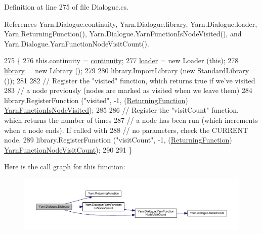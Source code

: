 Definition at line 275 of file Dialogue.\-cs.



References Yarn.\-Dialogue.\-continuity, Yarn.\-Dialogue.\-library, Yarn.\-Dialogue.\-loader, Yarn.\-Returning\-Function(), Yarn.\-Dialogue.\-Yarn\-Function\-Is\-Node\-Visited(), and Yarn.\-Dialogue.\-Yarn\-Function\-Node\-Visit\-Count().


\begin{DoxyCode}
275                                                          \{
276             this.continuity = \hyperlink{a00090_ae94eaa4b03b432422f5d205fabe37ff5}{continuity};
277             \hyperlink{a00090_a98bbe0ac2ccadeeeb7e05e3e6e19f2e0}{loader} = \textcolor{keyword}{new} Loader (\textcolor{keyword}{this});
278             \hyperlink{a00090_ae660d4cfb6e296358d2f61d8ee74c66a}{library} = \textcolor{keyword}{new} Library ();
279 
280             library.ImportLibrary (\textcolor{keyword}{new} StandardLibrary ());
281 
282             \textcolor{comment}{// Register the "visited" function, which returns true if we've visited}
283             \textcolor{comment}{// a node previously (nodes are marked as visited when we leave them)}
284             library.RegisterFunction (\textcolor{stringliteral}{"visited"}, -1, (\hyperlink{a00050_a5177bf74fbfe7303fac9d8236c2e514b}{ReturningFunction})
      \hyperlink{a00090_a1ab129bd84381928531d503304ca08d6}{YarnFunctionIsNodeVisited});
285 
286             \textcolor{comment}{// Register the "visitCount" function, which returns the number of times}
287             \textcolor{comment}{// a node has been run (which increments when a node ends). If called with}
288             \textcolor{comment}{// no parameters, check the CURRENT node.}
289             library.RegisterFunction (\textcolor{stringliteral}{"visitCount"}, -1, (\hyperlink{a00050_a5177bf74fbfe7303fac9d8236c2e514b}{ReturningFunction})
      \hyperlink{a00090_a10c9f22d3f55e74f091cd6069c431094}{YarnFunctionNodeVisitCount});
290 
291         \}
\end{DoxyCode}


Here is the call graph for this function\-:
\nopagebreak
\begin{figure}[H]
\begin{center}
\leavevmode
\includegraphics[width=350pt]{a00090_a349debf4c4b8d48e3d80ff31ad380b0e_cgraph}
\end{center}
\end{figure}




